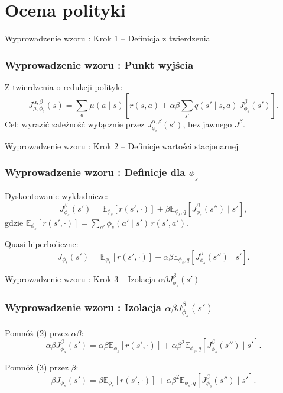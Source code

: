 \section{Ocena polityki}

\begin{frame}{Wyprowadzenie wzoru : Krok 1 -- Definicja z twierdzenia}
\frametitle{Wyprowadzenie wzoru : Punkt wyjścia}
Z twierdzenia o redukcji polityk:
\begin{equation}
J^{\alpha, \beta}_{\mu, \phi_s}(s) = \sum_a \mu(a\mid s) \left[ r(s, a) + \alpha\beta \sum_{s'} q(s'\mid s, a) \, J^{\beta}_{\phi_s}(s') \right].
\end{equation}
Cel: wyrazić zależność wyłącznie przez $J^{\alpha, \beta}_{\phi_s}(s')$, bez jawnego $J^{\beta}$.
\end{frame}

\begin{frame}{Wyprowadzenie wzoru : Krok 2 -- Definicje wartości stacjonarnej}
\frametitle{Wyprowadzenie wzoru : Definicje dla $\phi_s$}
Dyskontowanie wykładnicze:
\begin{equation}
J^{\beta}_{\phi_s}(s') = \mathbb{E}_{\phi_s} [r(s', \cdot)] + \beta \mathbb{E}_{\phi_s, q} [J^{\beta}_{\phi_s}(s'') \mid s'],
\end{equation}
gdzie $\mathbb{E}_{\phi_s} [r(s', \cdot)] = \sum_{a'} \phi_s(a'\mid s') \, r(s', a')$.

Quasi-hiperboliczne:
\begin{equation}
J_{\phi_s}(s') = \mathbb{E}_{\phi_s} [r(s', \cdot)] + \alpha \beta \mathbb{E}_{\phi_s, q} [J^{\beta}_{\phi_s}(s'') \mid s'].
\end{equation}
\end{frame}

\begin{frame}{Wyprowadzenie wzoru : Krok 3 -- Izolacja $\alpha \beta J^{\beta}_{\phi_s}(s')$}
\frametitle{Wyprowadzenie wzoru : Izolacja $\alpha \beta J^{\beta}_{\phi_s}(s')$}
Pomnóż (2) przez $\alpha \beta$:
\begin{equation}
\alpha \beta J^{\beta}_{\phi_s}(s') = \alpha \beta \mathbb{E}_{\phi_s} [r(s', \cdot)] + \alpha \beta^2 \mathbb{E}_{\phi_s, q} [J^{\beta}_{\phi_s}(s'') \mid s'].
\end{equation}

Pomnóż (3) przez $\beta$:
\begin{equation}
\beta J_{\phi_s}(s') = \beta \mathbb{E}_{\phi_s} [r(s', \cdot)] + \alpha \beta^2 \mathbb{E}_{\phi_s, q} [J^{\beta}_{\phi_s}(s'') \mid s'].
\end{equation}
\end{frame}

